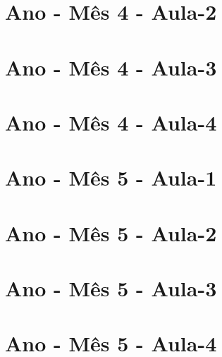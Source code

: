 \begin{multicols}{2}
	
\section[\sffamily 4\textordmasculine\space Ano - Mês 4 - Aula-2]{\textordmasculine\space Ano - Mês 4 - Aula-2}


\section[\sffamily 4\textordmasculine\space Ano - Mês 4 - Aula-3]{\textordmasculine\space Ano - Mês 4 - Aula-3}


\section[\sffamily 4\textordmasculine\space Ano - Mês 4 - Aula-4]{\textordmasculine\space Ano - Mês 4 - Aula-4}


\section[\sffamily 4\textordmasculine\space Ano - Mês 5 - Aula-1]{\textordmasculine\space Ano - Mês 5 - Aula-1}


\section[\sffamily 4\textordmasculine\space Ano - Mês 5 - Aula-2]{\textordmasculine\space Ano - Mês 5 - Aula-2}


\section[\sffamily 4\textordmasculine\space Ano - Mês 5 - Aula-3]{\textordmasculine\space Ano - Mês 5 - Aula-3}


\section[\sffamily 4\textordmasculine\space Ano - Mês 5 - Aula-4]{\textordmasculine\space Ano - Mês 5 - Aula-4}



\end{multicols}
